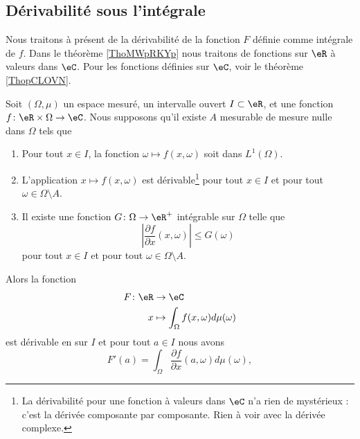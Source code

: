 \subsection{Dérivabilité sous l'intégrale}

Nous traitons à présent de la dérivabilité de la fonction \( F\) définie comme intégrale de \( f\). Dans le théorème \ref{ThoMWpRKYp} nous traitons de fonctions sur \( \eR\) à valeurs dans \( \eC\). Pour les fonctions définies sur \( \eC\), voir le théorème \ref{ThopCLOVN}.

\begin{theorem}    \label{ThoMWpRKYp}
	Soit \( (\Omega,\mu)\) un espace mesuré, un intervalle ouvert \( I\subset \eR\), et une fonction \( f\colon \eR\times \Omega\to \eC\). Nous supposons qu'il existe \( A\) mesurable de mesure nulle dans \( \Omega\) tels que
	\begin{enumerate}
		\item       \label{ITEMooAFVMooAeCEco}
		      Pour tout \( x\in I\), la fonction \( \omega\mapsto f(x,\omega)\) soit dans \( L^1(\Omega)\).
		\item        \label{ITEMooXIZXooGPYFyT}
		      L'application \( x\mapsto f(x,\omega)\) est dérivable\footnote{La dérivabilité pour une fonction à valeurs dans \( \eC\) n'a rien de mystérieux : c'est la dérivée composante par composante. Rien à voir avec la dérivée complexe.} pour tout \( x\in I\) et pour tout \( \omega\in \Omega\setminus A\).
		\item       \label{ITEMooDTTIooWkldfB}
		      Il existe une fonction \( G\colon \Omega\to \eR^+\) intégrable sur \( \Omega\) telle que
		      \begin{equation}        \label{EQooUHQYooHtwfML}
			      \left| \frac{ \partial f }{ \partial x }(x,\omega) \right| \leq G(\omega)
		      \end{equation}
		      pour tout \( x\in I\) et pour tout \( \omega\in\Omega\setminus A\).
	\end{enumerate}
	Alors la fonction
	\begin{equation}
		\begin{aligned}
			F\colon \eR & \to \eC                                      \\
			x           & \mapsto \int_{\Omega}f(x,\omega)d\mu(\omega)
		\end{aligned}
	\end{equation}
	est dérivable en sur \( I\) et pour tout \( a\in I\) nous avons
	\begin{equation}
		F'(a)=\int_{\Omega}\frac{ \partial f }{ \partial x }(a,\omega)d\mu(\omega),
	\end{equation}
\end{theorem}

